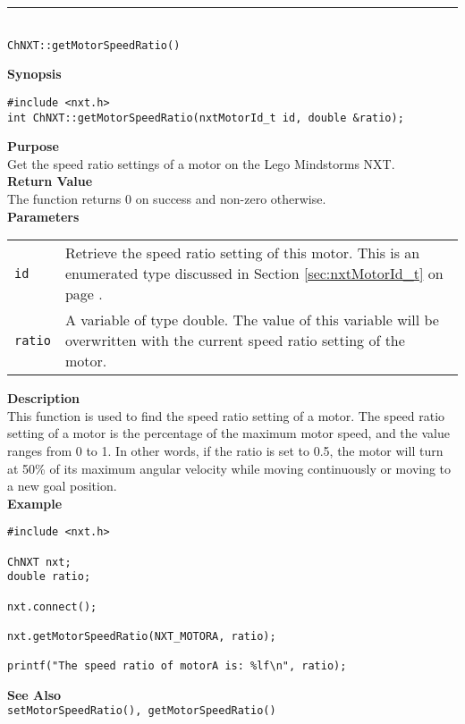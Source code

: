 \noindent
\vspace{5pt}
\rule{4.5in}{0.015in}\\
\noindent
{\LARGE \texttt{ChNXT::getMotorSpeedRatio()}}\\
{}

\noindent
{\bf Synopsis}
\begin{lstlisting}
#include <nxt.h>
int ChNXT::getMotorSpeedRatio(nxtMotorId_t id, double &ratio);
\end{lstlisting}

\noindent
{\bf Purpose}\\
Get the speed ratio settings of a motor on the Lego Mindstorms NXT.\\

\noindent
{\bf Return Value}\\
The function returns 0 on success and non-zero otherwise.\\

\noindent
{\bf Parameters}
\vspace{-0.1in}
\begin{description}
\item               
\begin{tabular}{p{10 mm}p{145 mm}}
\texttt{id} & Retrieve the speed ratio setting of this motor. This is an 
enumerated type discussed in Section \ref{sec:nxtMotorId_t} on page
\pageref{sec:nxtMotorId_t}.\\
\texttt{ratio} & A variable of type double. The value of this variable will
be overwritten with the current speed ratio setting of the motor.
\end{tabular}
\end{description}

\noindent
{\bf Description}\\
This function is used to find the speed ratio setting of a motor. The speed
ratio setting of a motor is the percentage of the maximum motor speed, and the
value ranges from 0 to 1. In other words, if the ratio is set to 0.5, the motor 
will turn at 50\% of its maximum angular velocity while moving continuously
or moving to a new goal position.\\

\noindent
{\bf Example}
\begin{lstlisting}
#include <nxt.h>

ChNXT nxt;
double ratio;

nxt.connect();

nxt.getMotorSpeedRatio(NXT_MOTORA, ratio);

printf("The speed ratio of motorA is: %lf\n", ratio);
\end{lstlisting}

\noindent
{\bf See Also}\\
\texttt{setMotorSpeedRatio(), getMotorSpeedRatio()}

